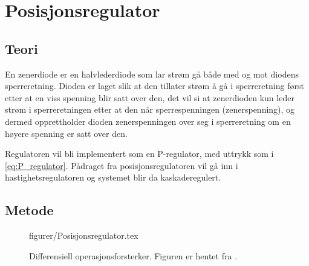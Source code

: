 \section{Posisjonsregulator}\label{sec:posisjonsregulator}

\subsection{Teori}


En zenerdiode er en halvlederdiode som lar strøm gå både med og mot diodens sperreretning. Dioden er laget slik at den tillater strøm å gå i sperreretning først etter at en viss spenning blir satt over den, det vil si at zenerdioden kun leder strøm i sperreretningen etter at den når sperrespenningen (zenerspenning), og dermed opprettholder dioden zenerspenningen over seg i sperreretning om en høyere spenning er satt over den.

Regulatoren vil bli implementert som en P-regulator, med uttrykk som i \eqref{eq:P_regulator}. Pådraget fra posisjonsregulatoren vil gå inn i hastighetsregulatoren og systemet blir da kaskaderegulert.








\subsection{Metode}

\begin{figure} [h]
    \centering
     {figurer/Posisjonsregulator.tex}
    \caption{Differensiell operasjonsforsterker. Figuren er hentet fra \cite{AnalogMotorlabbOppgaver}.}
    \label{fig:Posisjonsregulator}
\end{figure}

